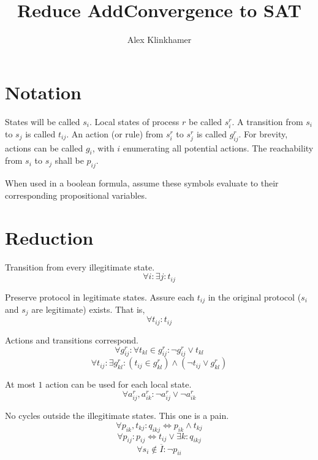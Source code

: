 



\title{Reduce AddConvergence to SAT}
\author{Alex Klinkhamer}
\maketitle

\section{Notation}
States will be called $s_i$.
Local states of process $r$ be called $s_i^r$.
A transition from $s_i$ to $s_j$ is called $t_{ij}$.
An action (or rule) from $s_i^r$ to $s_j^r$ is called $g_{ij}^r$.
For brevity, actions can be called $g_i$, with $i$ enumerating all potential actions.
The reachability from $s_i$ to $s_j$ shall be $p_{ij}$.

When used in a boolean formula, assume these symbols evaluate to their corresponding propositional variables.

\section{Reduction}
Transition from every illegitimate state.
$$\forall i:\exists j: t_{ij}$$

Preserve protocol in legitimate states.
Assure each $t_{ij}$ in the original protocol ($s_i$ and $s_j$ are legitimate) exists. That is, $$\forall t_{ij}: t_{ij}$$

Actions and transitions correspond.
$$\forall g_{ij}^r:\forall t_{kl}\in g_{ij}^r: \neg g_{ij}^r \vee t_{kl}$$
$$\forall t_{ij}:\exists g_{kl}^r: \left(t_{ij}\in g_{kl}^r\right) \wedge\left(\neg t_{ij}\vee g_{kl}^r\right)$$

At most $1$ action can be used for each local state.
$$\forall a_{ij}^r, a_{ik}^r: \neg a_{ij}^r \vee \neg a_{ik}^r$$

No cycles outside the illegitimate states.
This one is a pain.
$$\forall p_{ik},t_{kj}: q_{ikj}\iff p_{ik} \wedge t_{kj}$$
$$\forall p_{ij}: p_{ij}\iff t_{ij}\vee\exists k: q_{ikj}$$
$$\forall s_i\notin \overline{I}: \neg p_{ii}$$



